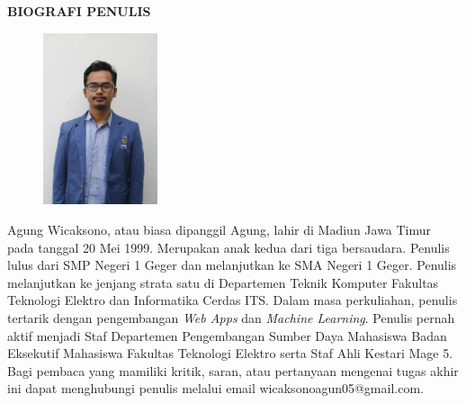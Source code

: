 \begin{center}
  \Large
  \textbf{BIOGRAFI PENULIS}
\end{center}


\vspace{2ex}

\begin{figure}
  \centering
  \vspace{-3ex}
  \includegraphics[width=0.3\textwidth]{gambar/agung.jpg}
  \vspace{-4ex}
\end{figure}

Agung Wicaksono, atau biasa dipanggil Agung, lahir di Madiun Jawa Timur pada tanggal 20 Mei 1999. Merupakan anak kedua dari tiga bersaudara. Penulis lulus dari SMP Negeri 1 Geger dan melanjutkan ke SMA Negeri 1 Geger. Penulis melanjutkan ke jenjang strata satu di Departemen Teknik Komputer Fakultas Teknologi Elektro dan Informatika Cerdas ITS. Dalam masa perkuliahan, penulis tertarik dengan pengembangan \textit{Web Apps} dan \textit{Machine Learning}. Penulis pernah aktif menjadi Staf Departemen Pengembangan Sumber Daya Mahasiswa Badan Eksekutif Mahasiswa Fakultas Teknologi Elektro serta Staf Ahli Kestari Mage 5. Bagi pembaca yang mamiliki kritik, saran, atau pertanyaan mengenai tugas akhir ini dapat menghubungi penulis melalui email wicaksonoagun05@gmail.com.
